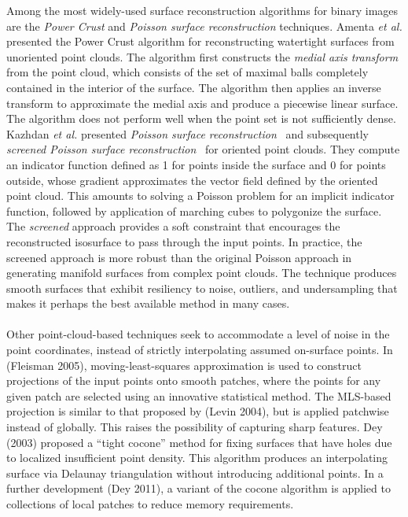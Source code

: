 Among the most widely-used surface reconstruction algorithms for binary images are the \textit{Power Crust} and \textit{Poisson surface reconstruction} techniques. Amenta \textit{et al.} \cite{amenta_2001} presented the Power Crust algorithm for reconstructing watertight surfaces from unoriented point clouds. The algorithm first constructs the \textit{medial axis transform} from the point cloud, which consists of the set of maximal balls completely contained in the interior of the surface. The algorithm then applies an inverse transform to approximate the medial axis and produce a piecewise linear surface. The algorithm does not perform well when the point set is not sufficiently dense. Kazhdan \textit{et al.} presented \textit{Poisson surface reconstruction}~\cite{kazhdan_2008} and subsequently \textit{screened Poisson surface reconstruction}~\cite{kazhdan_2013} for oriented point clouds. They compute an indicator function defined as 1 for points inside the surface and 0 for points outside, whose gradient approximates the vector field defined by the oriented point cloud. This amounts to solving a Poisson problem for an implicit indicator function, followed by application of marching cubes to polygonize the surface. The \textit{screened} approach provides a soft constraint that encourages the reconstructed isosurface to pass through the input points. In practice, the screened approach is more robust than the original Poisson approach in generating manifold surfaces from complex point clouds. The technique produces smooth surfaces that exhibit resiliency to noise, outliers, and undersampling that makes it perhaps the best available method in many cases. \\ \\


Other point-cloud-based techniques seek to accommodate a level of noise in the point coordinates, instead of strictly interpolating assumed on-surface points.  In (Fleisman 2005), moving-least-squares approximation is used to construct projections of the input points onto smooth patches, where the points for any given patch are selected using an innovative statistical method.  The MLS-based projection is similar to that proposed by (Levin 2004), but is applied patchwise instead of globally.  This raises the possibility of capturing sharp features. Dey (2003) proposed a ``tight cocone'' method for fixing surfaces that have holes due to localized insufficient point density.  This algorithm produces an interpolating surface via Delaunay triangulation without introducing additional points.  In a further development (Dey 2011), a variant of the cocone algorithm is applied to collections of local patches to reduce memory requirements.  

